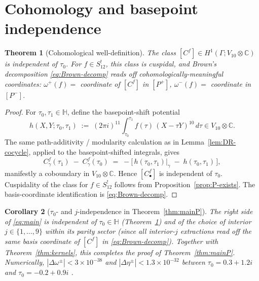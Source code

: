\documentclass[11pt,letterpaper]{article}
\newtheorem{theorem}{Theorem}[section]
\newtheorem{corollary}[theorem]{Corollary}
\newcommand{\HH}{\mathbb{H}}
\newcommand{\CC}{\mathbb{C}}
\begin{document}
\section{Cohomology and basepoint independence}\label{sec:cohomology}

\begin{theorem}[Cohomological well-definition]\label{thm:cohomology}
The class $[C^f] \in H^1(\Gamma; V_{10}\otimes\CC)$ is independent of
$\tau_0$.  For $f \in S_{12}^!$, this class is cuspidal, and Brown's
decomposition \eqref{eq:Brown-decomp} reads off
cohomologically-meaningful coordinates: $\omega^+(f) = $ coordinate of
$[C^f]$ in $[P^+]$, $\omega^-(f) = $ coordinate in $[P^-]$.
\end{theorem}

\begin{proof}
For $\tau_0, \tau_1 \in \HH$, define the basepoint-shift potential
\begin{equation}\label{eq:bp-h}
  h(X, Y;\tau_0, \tau_1) \;:=\; (2\pi i)^{11}\!\int_{\tau_0}^{\tau_1}\!
                                f(\tau)\,(X - \tau Y)^{10}\,d\tau \in V_{10}\otimes\CC.
\end{equation}
The same path-additivity / modularity calculation as in
Lemma~\ref{lem:DR-cocycle}, applied to the basepoint-shifted integrals,
gives
\begin{equation}\label{eq:bp-cocycle}
  C^f_\gamma(\tau_1) \;-\; C^f_\gamma(\tau_0) \;=\;
    -\bigl[\,h(\tau_0, \tau_1)|_\gamma \;-\; h(\tau_0, \tau_1)\,\bigr],
\end{equation}
manifestly a coboundary in $V_{10}\otimes\CC$.  Hence
$[C^f_\bullet]$ is independent of $\tau_0$.  Cuspidality of the class
for $f \in S_{12}^!$ follows from Proposition~\ref{prop:P-exists}.  The
basis-coordinate identification is \eqref{eq:Brown-decomp}.
\end{proof}

\begin{corollary}[$\tau_0$- and $j$-independence in Theorem~\ref{thm:mainP}]\label{cor:tau0-j-indep}
The right side of \eqref{eq:main} is independent of $\tau_0 \in \HH$
(Theorem~\ref{thm:cohomology}) and of the choice of interior
$j \in \{1, \ldots, 9\}$ within its parity sector (since all
interior-$j$ extractions read off the same basis coordinate of $[C^f]$
in \eqref{eq:Brown-decomp}).  Together with
Theorem~\ref{thm:kernels}, this completes the proof of
Theorem~\ref{thm:mainP}.  Numerically, $|\Delta\omega^\pm| < 3\times 10^{-38}$
and $|\Delta\eta^\pm| < 1.3\times 10^{-32}$ between
$\tau_0 = 0.3 + 1.2i$ and $\tau_0 = -0.2 + 0.9i$ \cite{Notebook}.
\end{corollary}
\end{document}
